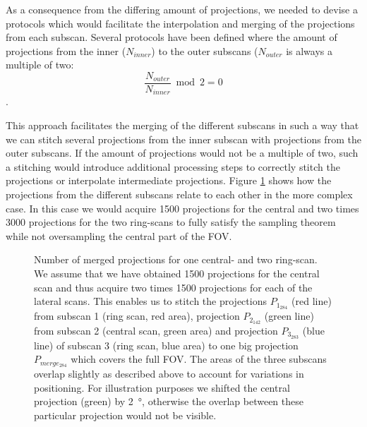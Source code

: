 As a consequence from the differing amount of projections, we needed to devise a protocols which would facilitate the interpolation and merging of the projections from each subscan. Several protocols have been defined where the amount of projections from the inner ($N_{inner}$) to the outer subscans ($N_{outer}$ is always a multiple of two:\[\frac{N_{outer}}{N_{inner}} \bmod 2 = 0\].

This approach facilitates the merging of the different subscans in such a way that we can stitch several projections from the inner subscan with projections from the outer subscans. If the amount of projections would not be a multiple of two, such a stitching would introduce additional processing steps to correctly stitch the projections or interpolate intermediate projections. \cbend Figure \ref{fig:amount of projections} shows how the projections from the different subscans relate to each other in the more complex case. In this case we would acquire 1500 projections for the central and two times 3000 projections for the two ring-scans to fully satisfy the sampling theorem while not oversampling the central part of the FOV. 

\begin{figure}[htp]
	\centering
	\caption[Number of merged projections for one central- and two ring-scan.]{Number of merged projections for one central- and two ring-scan. We assume that we have obtained 1500 projections for the central scan and thus acquire two times 1500 projections for each of the lateral scans. This enables us to stitch the projections $P_{1_{284}}$ %
 		(red line) from subscan 1 (ring scan, red area), projection $P_{2_{142}}$ %
 		(green line) from subscan 2 (central scan, green area) and projection $P_{3_{283}}$ %
 		(blue line) of subscan 3 (ring scan, blue area) to one big projection $P_{merge_{284}}$ %
		which covers the full FOV. The areas of the three subscans overlap slightly as described above to account for variations in positioning. For illustration purposes we shifted the central projection (green) by \SI{2}{\degree}, otherwise the overlap between these particular projection would not be visible.}%
	\label{fig:amount of projections}%
\end{figure}

\cbstart
